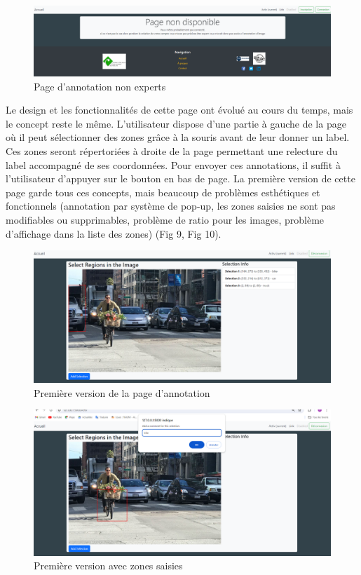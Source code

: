 \documentclass[
  10pt,
]{article}
\begin{document}
\begin{figure}[htbp]
\centering
\includegraphics[width=\textwidth]{img_rmd/fig13.png}
\caption{Page d'annotation non experts}
\end{figure}

Le design et les fonctionnalités de cette page ont évolué au cours du
temps, mais le concept reste le même. L'utilisateur dispose d'une partie
à gauche de la page où il peut sélectionner des zones grâce à la souris
avant de leur donner un label. Ces zones seront répertoriées à droite de
la page permettant une relecture du label accompagné de ses coordonnées.
Pour envoyer ces annotations, il suffit à l'utilisateur d'appuyer sur le
bouton en bas de page. La première version de cette page garde tous ces
concepts, mais beaucoup de problèmes esthétiques et fonctionnels
(annotation par système de pop-up, les zones saisies ne sont pas
modifiables ou supprimables, problème de ratio pour les images, problème
d'affichage dans la liste des zones) (Fig 9, Fig 10).

\begin{figure}[htbp]
\centering
\includegraphics[width=\textwidth]{img_rmd/fig8.png}
\caption{Première version de la page d'annotation}
\end{figure}

\begin{figure}[htbp]
\centering
\includegraphics[width=\textwidth]{img_rmd/fig9.png}
\caption{Première version avec zones saisies}
\end{figure}
\end{document}
